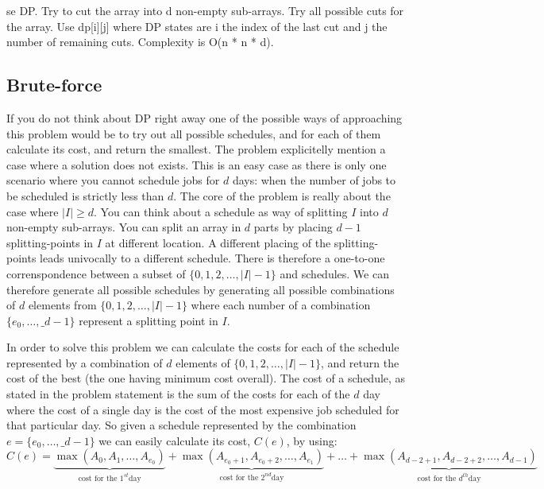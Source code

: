 se DP. Try to cut the array into d non-empty sub-arrays. Try all possible cuts for the array.
Use dp[i][j] where DP states are i the index of the last cut and j the number of remaining cuts. Complexity is O(n * n * d).

\subsection{Brute-force}
\label{min_difficulty_job_scheduler:sec:bruteforce}
If you do not think about DP right away one of the possible ways of approaching this problem would be to try out all possible schedules, and for each of them calculate its cost, 
and return the smallest. 
The problem explicitelly mention a case where a solution does not exists. This is an easy case as there is only one scenario
where you cannot schedule jobs for $d$ days: when the number of jobs to be scheduled is strictly less than $d$.
The core of the problem is really about the case where $|I| \geq d$. 
You can think about a schedule as way of splitting $I$ into $d$ non-empty sub-arrays.
You can split an array in $d$ parts by placing $d-1$ splitting-points in $I$ at different location.
A different placing of the splitting-points leads univocally to a different schedule. 
There is therefore a one-to-one correnspondence between a subset of $\{0,1,2, \ldots, |I|-1\}$ and schedules. 
We can therefore generate all possible schedules by generating all possible combinations of $d$ elements from $\{0,1,2, \ldots, |I|-1\}$
where each number of a combination  $\{e_0, \ldots, \_{d-1}\}$ represent a splitting point in $I$.

In order to solve this problem we can calculate the costs for each of the schedule represented by a combination of $d$ elements of $\{0,1,2, \ldots, |I|-1\}$, and return the cost of the best (the one having minimum cost overall).
The cost of a schedule, as stated in the problem statement is the sum of the costs for each of the $d$ day where the cost of a single day is the cost of the most expensive job scheduled for that particular day. 
So given a schedule represented by the combination $e = \{e_0, \ldots, \_{d-1}\}$ we can easily calculate its cost, $C(e)$, by using:
\begin{equation*}
	C(e) = \underbrace{\max(A_0, A_1, \ldots, A_{e_0})}_{\text{cost for the } 1^{st} \text{day}} + \underbrace{\max(A_{e_0+1}, A_{e_0+2}, \ldots, A_{e_1})}_{\text{cost for the } 2^{nd} \text{day}} + \ldots + \underbrace{\max(A_{d-2+1}, A_{d-2+2}, \ldots, A_{d-1})}_{\text{cost for the } d^{th} \text{day}}
\end{equation*}


